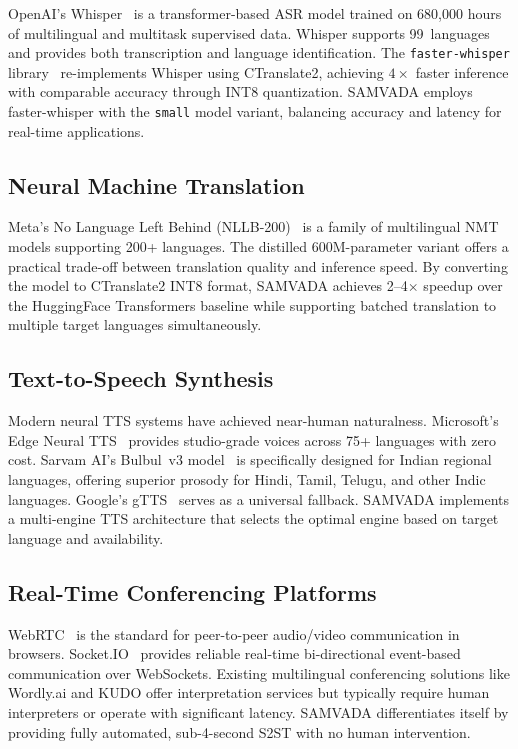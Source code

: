 \documentclass[conference]{IEEEtran}
\begin{document}
OpenAI's Whisper~\cite{whisper} is a transformer-based ASR model trained on 680,000 hours of multilingual and multitask supervised data. Whisper supports 99~languages and provides both transcription and language identification. The \texttt{faster-whisper} library~\cite{fasterwhisper} re-implements Whisper using CTranslate2, achieving $4\times$ faster inference with comparable accuracy through INT8 quantization. SAMVADA employs faster-whisper with the \texttt{small} model variant, balancing accuracy and latency for real-time applications.

\subsection{Neural Machine Translation}

Meta's No Language Left Behind (NLLB-200)~\cite{nllb} is a family of multilingual NMT models supporting 200+ languages. The distilled 600M-parameter variant offers a practical trade-off between translation quality and inference speed. By converting the model to CTranslate2 INT8 format, SAMVADA achieves 2--4$\times$ speedup over the HuggingFace Transformers baseline while supporting batched translation to multiple target languages simultaneously.

\subsection{Text-to-Speech Synthesis}

Modern neural TTS systems have achieved near-human naturalness. Microsoft's Edge Neural TTS~\cite{edgetts} provides studio-grade voices across 75+ languages with zero cost. Sarvam AI's Bulbul~v3 model~\cite{sarvam} is specifically designed for Indian regional languages, offering superior prosody for Hindi, Tamil, Telugu, and other Indic languages. Google's gTTS~\cite{gtts} serves as a universal fallback. SAMVADA implements a multi-engine TTS architecture that selects the optimal engine based on target language and availability.

\subsection{Real-Time Conferencing Platforms}

WebRTC~\cite{webrtc} is the standard for peer-to-peer audio/video communication in browsers. Socket.IO~\cite{socketio} provides reliable real-time bi-directional event-based communication over WebSockets. Existing multilingual conferencing solutions like Wordly.ai and KUDO offer interpretation services but typically require human interpreters or operate with significant latency. SAMVADA differentiates itself by providing fully automated, sub-4-second S2ST with no human intervention.
\end{document}
